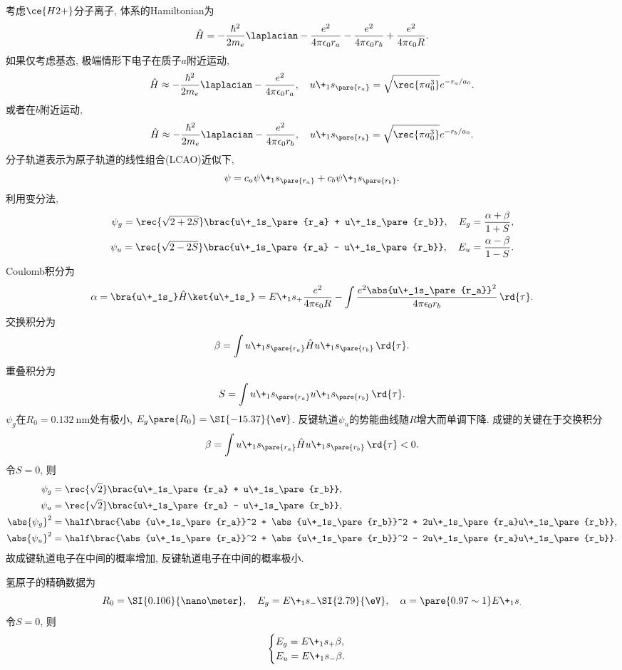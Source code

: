 \documentclass[hidelinks]{ctexart}
\begin{document}
\newpoint{}考虑$\ce{H2+}$分子离子, 体系的Hamiltonian为
\[ \hat H = -\frac{\hbar^2}{2m_e} \laplacian - \frac{e^2}{4\pi\epsilon_0 r_a} - \frac{e^2}{4\pi\epsilon_0 r_b} + \frac{e^2}{4\pi\epsilon_0 R}. \]
\newpoint{}如果仅考虑基态, 极端情形下电子在质子$a$附近运动,
\[ \hat H \approx -\frac{\hbar^2}{2m_e}\laplacian - \frac{e^2}{4\pi\epsilon_0 r_a},\quad u\+_1s_\pare{r_a} = \sqrt{\rec{\pi a_0^3}}e^{-r_a/a_0}. \]
或者在$b$附近运动,
\[ \hat H \approx -\frac{\hbar^2}{2m_e}\laplacian - \frac{e^2}{4\pi\epsilon_0 r_b},\quad u\+_1s_\pare{r_b} = \sqrt{\rec{\pi a_0^3}}e^{-r_b/a_0}. \]
\newpoint{}分子轨道表示为原子轨道的线性组合(LCAO)近似下,
\[ \psi = c_a \psi\+_1s_\pare{r_a} + c_b \psi\+_1s_\pare{r_b}. \]
利用变分法,
\begin{align*}
    \psi_g = \rec{\sqrt{2+2S}}\brac{u\+_1s_\pare{r_a} + u\+_1s_\pare{r_b}},\quad E_g = \frac{\alpha + \beta}{1+S}, \\
    \psi_u = \rec{\sqrt{2-2S}}\brac{u\+_1s_\pare{r_a} - u\+_1s_\pare{r_b}},\quad E_u = \frac{\alpha - \beta}{1-S}.
\end{align*}
Coulomb积分为
\[ \alpha = \bra{u\+_1s_}\hat H \ket{u\+_1s_} = E\+_1s_ + \frac{e^2}{4\pi\epsilon_0 R} - \int \frac{e^2\abs{u\+_1s_\pare{r_a}}^2}{4\pi\epsilon_0 r_b}\,\rd{\tau}. \]
交换积分为
\[ \beta = \int u\+_1s_\pare{r_a}\hat H u\+_1s_\pare{r_b}\,\rd{\tau}. \]
重叠积分为
\[ S = \int u\+_1s_\pare{r_a} u\+_1s_\pare{r_b}\,\rd{\tau}. \]
$\psi_g$在$R_0 = \SI{0.132}{\nano\meter}$处有极小, $E_g\pare{R_0} = \SI{-15.37}{\eV}$. 反键轨道$\psi_u$的势能曲线随$R$增大而单调下降. 成键的关键在于交换积分
\[ \beta = \int u\+_1s_\pare{r_a}\hat H u\+_1s_\pare{r_b}\,\rd{\tau} < 0. \]
令$S=0$, 则
\begin{align*}
    \psi_g &= \rec{\sqrt{2}}\brac{u\+_1s_\pare{r_a} + u\+_1s_\pare{r_b}}, \\
    \psi_u &= \rec{\sqrt{2}}\brac{u\+_1s_\pare{r_a} - u\+_1s_\pare{r_b}}, \\
    \abs{\psi_{g}}^2 &= \half \brac{\abs{u\+_1s_\pare{r_a}}^2 + \abs{u\+_1s_\pare{r_b}}^2 + 2u\+_1s_\pare{r_a}u\+_1s_\pare{r_b}}, \\
    \abs{\psi_{u}}^2 &= \half \brac{\abs{u\+_1s_\pare{r_a}}^2 + \abs{u\+_1s_\pare{r_b}}^2 - 2u\+_1s_\pare{r_a}u\+_1s_\pare{r_b}}.
\end{align*}
故成键轨道电子在中间的概率增加, 反键轨道电子在中间的概率极小.
\par
氢原子的精确数据为
\[ R_0 = \SI{0.106}{\nano\meter},\quad E_g = E\+_1s_ - \SI{2.79}{\eV},\quad \alpha = \pare{0.97\sim 1}E\+_1s_. \]
令$S=0$, 则
\[ \begin{cases}
    E_g = E\+_1s_ + \beta, \\
    E_u = E\+_1s_ - \beta.
\end{cases} \]
\end{document}
